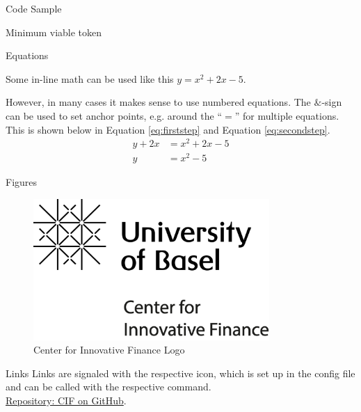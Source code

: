 \documentclass[]{beamer}
\begin{document}


\begin{frame}{Code Sample}
	\begin{samplecode}{Minimum viable token}
		
	\end{samplecode}
\end{frame}


\begin{frame}{Equations}

Some in-line math can be used like this $y=x^2+2x-5$. \\ \vspace{1em}

However, in many cases it makes sense to use numbered equations. The $\&$-sign can be used to set anchor points, e.g. around the ``$=$'' for multiple equations. This is shown below in Equation \eqref{eq:firststep} and Equation \eqref{eq:secondstep}.
	\begin{align}
		y + 2x &= x^2+2x-5 \label{eq:firststep}\\
		y &= x^2-5 \label{eq:secondstep}
	\end{align}
\end{frame}

\begin{frame}{Figures}
	\begin{figure}
		\center
		\includegraphics[width=0.8\textwidth]{../config/logo_cif}	
		\caption{Center for Innovative Finance Logo}
		\label{fig:logo}
	\end{figure}
\end{frame}

\begin{frame}{Links}
		Links are signaled with the respective icon, which is set up in the config file and can be called with the respective command.\\
		
		\link \href{https://github.com/cifunibas}{Repository: CIF on GitHub}.
		
\end{frame}
\end{document}
